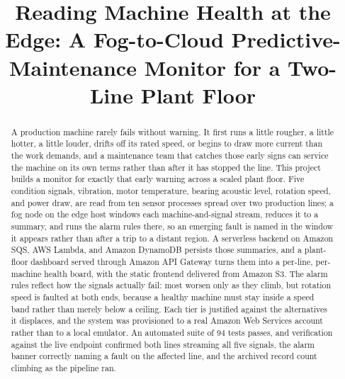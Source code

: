 \documentclass[conference]{IEEEtran}
\begin{document}
\title{Reading Machine Health at the Edge: A Fog-to-Cloud Predictive-Maintenance Monitor for a Two-Line Plant Floor}

\author{
}

\maketitle

\begin{abstract}
A production machine rarely fails without warning. It first runs a little rougher, a little hotter, a little louder, drifts off its rated speed, or begins to draw more current than the work demands, and a maintenance team that catches those early signs can service the machine on its own terms rather than after it has stopped the line. This project builds a monitor for exactly that early warning across a scaled plant floor. Five condition signals, vibration, motor temperature, bearing acoustic level, rotation speed, and power draw, are read from ten sensor processes spread over two production lines; a fog node on the edge host windows each machine-and-signal stream, reduces it to a summary, and runs the alarm rules there, so an emerging fault is named in the window it appears rather than after a trip to a distant region. A serverless backend on Amazon SQS, AWS Lambda, and Amazon DynamoDB persists those summaries, and a plant-floor dashboard served through Amazon API Gateway turns them into a per-line, per-machine health board, with the static frontend delivered from Amazon S3. The alarm rules reflect how the signals actually fail: most worsen only as they climb, but rotation speed is faulted at both ends, because a healthy machine must stay inside a speed band rather than merely below a ceiling. Each tier is justified against the alternatives it displaces, and the system was provisioned to a real Amazon Web Services account rather than to a local emulator. An automated suite of 94 tests passes, and verification against the live endpoint confirmed both lines streaming all five signals, the alarm banner correctly naming a fault on the affected line, and the archived record count climbing as the pipeline ran.
\end{abstract}
\end{document}
